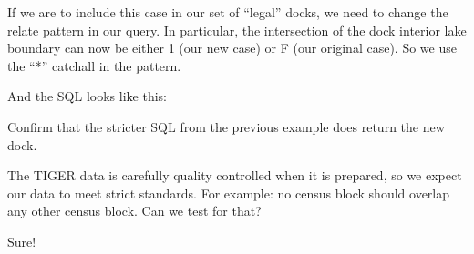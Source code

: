\documentclass[a4paper,11pt,english]{sphinxmanual}
\begin{document}
\noindent{}

If we are to include this case in our set of “legal” docks, we need to change the relate pattern in our query. In particular, the intersection of the dock interior lake boundary can now be either 1 (our new case) or F (our original case). So we use the “*” catchall in the pattern.

\noindent{}

And the SQL looks like this:

\begin{sphinxVerbatim}[commandchars=\\\{\}]
 
      
   

\end{sphinxVerbatim}

Confirm that the stricter SQL from the previous example does  return the new dock.

The TIGER data is carefully quality controlled when it is prepared, so we expect our data to meet strict standards. For example: no census block should overlap any other census block. Can we test for that?

\noindent{}

Sure!

\begin{sphinxVerbatim}[commandchars=\\\{\}]
  
    
  
     
     
 

\end{sphinxVerbatim}
\end{document}
